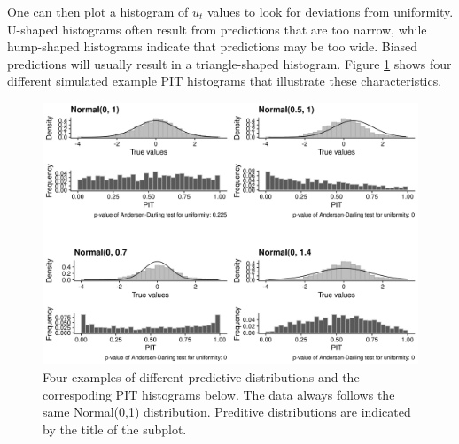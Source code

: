 \documentclass[
]{book}
\begin{document}
One can then plot a histogram of \(u_t\) values to look for deviations from uniformity. U-shaped histograms often result from predictions that are too narrow, while hump-shaped histograms indicate that predictions may be too wide. Biased predictions will usually result in a triangle-shaped histogram. Figure \ref{fig:pit-examples} shows four different simulated example PIT histograms that illustrate these characteristics.

\begin{figure}

{\centering \includegraphics[width=1\linewidth]{../visualisation/chapter-3-evaluation/calibration-examples} 

}

\caption{Four examples of different predictive distributions and the correspoding PIT histograms below. The data always follows the same Normal(0,1) distribution. Preditive distributions are indicated by the title of the subplot.}\label{fig:pit-examples}
\end{figure}
\end{document}
